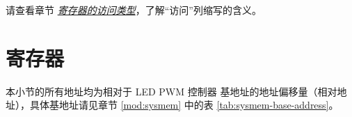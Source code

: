 \documentclass[main\_\_CN.tex]{subfiles}
\begin{document}
请查看章节 \hyperref[glossary-access-types]{\textit{寄存器的访问类型}}，了解“访问”列缩写的含义。






\clearpage
\section{寄存器}
\label{sec:ledc-reg-field}

本小节的所有地址均为相对于 LED PWM 控制器 基地址的地址偏移量（相对地址），具体基地址请见章节 \ref{mod:sysmem} \textit{} 中的表 \ref{tab:sysmem-base-address}。


\end{document}
